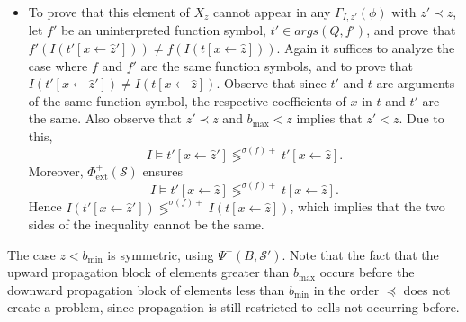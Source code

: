 \documentclass[runningheads]{llncs}
\newcommand{\cmpsignstrict}[1]{\lessgtr^{#1}}
\newcommand{\coeffsign}[1]{\sigma(#1)}
\newcommand{\subst}[3]{#1[#2\leftarrow #3]}
\newcommand{\repr}[1]{\hat{#1}}
\begin{document}
\begin{itemize}
        
      \item To prove that this element of $X_z$ cannot appear in any $\Gamma_{I,z'}(\phi)$ with $z' \prec z$, let $f'$ be an uninterpreted function symbol, $t'\in args(Q,f')$,  and prove that $f'(I(\subst{t'}{x}{\repr{z}'}))\neq f(I(\subst{t}{x}{\repr{z}}))$. Again it suffices to analyze the case where $f$ and $f'$ are the same function symbols, and to prove that
        $I(\subst{t'}{x}{\repr{z}'})\neq I(\subst{t}{x}{\repr{z}})$. Observe that since $t'$ and $t$ are arguments of the same function symbol, the respective coefficients of $x$ in $t$ and $t'$ are the same. Also observe that $z'\prec z$ and $b_{\max}<z$ implies that $z'<z$. Due to this,
        \[
          I\models \subst{t'}{x}{\hat{z}'}\cmpsignstrict{\coeffsign{f}+} \subst{t'}{x}{\hat{z}}.
        \]
        Moreover, $\Phi^{+}_{\text{ext}}(\mathcal{S})$ ensures 
                \[
          I\models \subst{t'}{x}{\hat{z}}\cmpsignstrict{\coeffsign{f}+}\subst{t}{x}{\hat{z}}.
        \]
Hence $I(\subst{t'}{x}{\repr{z}'})\cmpsignstrict{\coeffsign{f}+} I(\subst{t}{x}{\repr{z}})$, which implies that the two sides of the inequality cannot be the same.
            
    \end{itemize}

  The case $z < b_{\min}$ is symmetric, using $\Psi^-(B,\mathcal{S}')$. Note that the fact that the upward propagation block of elements greater than $b_{\max}$ occurs before the downward propagation block of elements less than $b_{\min}$ in the order $\preceq$ does not create a problem, since  propagation is still restricted to cells not occurring before.
\end{document}
